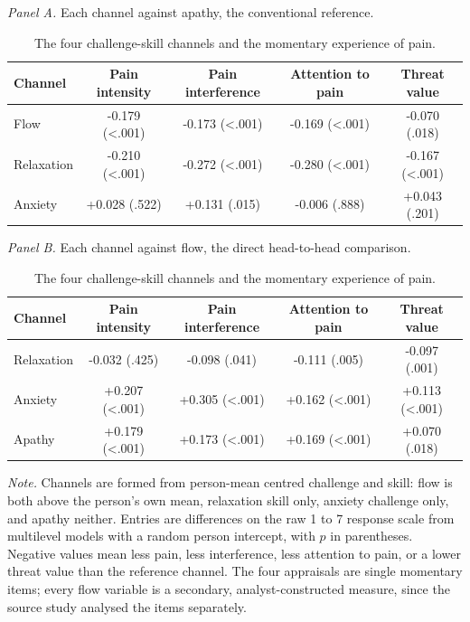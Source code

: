 \begin{table}[!htbp]
\raggedright
\caption{The four challenge-skill channels and the momentary experience of pain.}
\label{tab:channels}
\footnotesize
\begingroup
\setlength{\tabcolsep}{4pt}
\renewcommand{\arraystretch}{1.08}
\noindent\textit{Panel A.} Each channel against apathy, the conventional reference.\par\vspace{2pt}
\begin{tabular*}{\textwidth}{@{\extracolsep{\fill}}lcccc@{}}
\toprule
Channel & Pain intensity & Pain interference & Attention to pain & Threat value \\
\midrule
Flow & -0.179 (<.001) & -0.173 (<.001) & -0.169 (<.001) & -0.070 (.018) \\
Relaxation & -0.210 (<.001) & -0.272 (<.001) & -0.280 (<.001) & -0.167 (<.001) \\
Anxiety & +0.028 (.522) & +0.131 (.015) & -0.006 (.888) & +0.043 (.201) \\
\bottomrule
\end{tabular*}
\par\vspace{6pt}\noindent\textit{Panel B.} Each channel against flow, the direct head-to-head comparison.\par\vspace{2pt}
\begin{tabular*}{\textwidth}{@{\extracolsep{\fill}}lcccc@{}}
\toprule
Channel & Pain intensity & Pain interference & Attention to pain & Threat value \\
\midrule
Relaxation & -0.032 (.425) & -0.098 (.041) & -0.111 (.005) & -0.097 (.001) \\
Anxiety & +0.207 (<.001) & +0.305 (<.001) & +0.162 (<.001) & +0.113 (<.001) \\
Apathy & +0.179 (<.001) & +0.173 (<.001) & +0.169 (<.001) & +0.070 (.018) \\
\bottomrule
\end{tabular*}
\par\vspace{3pt}\noindent\parbox{\textwidth}{\footnotesize\textit{Note.} Channels are formed from person-mean centred challenge and skill: flow is both above the person's own mean, relaxation skill only, anxiety challenge only, and apathy neither. Entries are differences on the raw 1 to 7 response scale from multilevel models with a random person intercept, with $p$ in parentheses. Negative values mean less pain, less interference, less attention to pain, or a lower threat value than the reference channel. The four appraisals are single momentary items; every flow variable is a secondary, analyst-constructed measure, since the source study analysed the items separately.}
\endgroup
\end{table}
